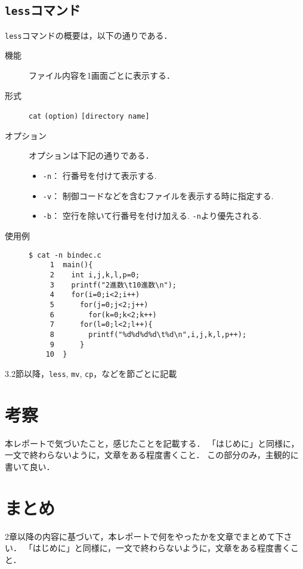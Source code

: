 \documentclass[a4j,11pt]{jarticle}
\begin{document}
\subsection{\texttt{less}コマンド}
\verb|less|コマンドの概要は，以下の通りである．
\begin{description}
  \item[機能] %
    ファイル内容を1画面ごとに表示する．
  \item[形式] %
    \verb|cat| \verb|(option)| \verb|[directory name]|
  \item[オプション] %
オプションは下記の通りである．
 \begin{itemize}
      \item \verb|-n|：  行番号を付けて表示する.
      \item \verb|-v|：  制御コードなどを含むファイルを表示する時に指定する.
      \item \verb|-b|：  空行を除いて行番号を付け加える. \verb|-n|より優先される.
    \end{itemize}
  \item[使用例] %
    \begin{verbatim}
$ cat -n bindec.c
     1	main(){
     2	  int i,j,k,l,p=0;
     3	  printf("2進数\t10進数\n");
     4	  for(i=0;i<2;i++)
     5	    for(j=0;j<2;j++)
     6	      for(k=0;k<2;k++)
     7		for(l=0;l<2;l++){
     8		  printf("%d%d%d%d\t%d\n",i,j,k,l,p++);
     9		}
    10	}

    \end{verbatim}
\end{description}



3.2節以降，\verb|less|, \verb|mv|, \verb|cp|，などを節ごとに記載


\section{考察}
本レポートで気づいたこと，感じたことを記載する．
「はじめに」と同様に，一文で終わらないように，文章をある程度書くこと．
この部分のみ，主観的に書いて良い．

\section{まとめ}
2章以降の内容に基づいて，本レポートで何をやったかを文章でまとめて下さい．
「はじめに」と同様に，一文で終わらないように，文章をある程度書くこと．
\end{document}
